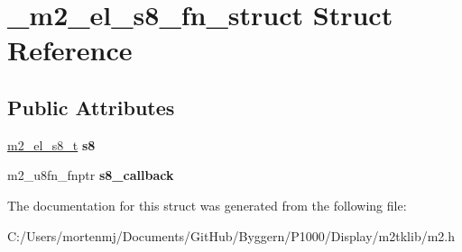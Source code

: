 \hypertarget{struct__m2__el__s8__fn__struct}{\section{\-\_\-m2\-\_\-el\-\_\-s8\-\_\-fn\-\_\-struct Struct Reference}
\label{struct__m2__el__s8__fn__struct}
}
\subsection*{Public Attributes}
\begin{DoxyCompactItemize}
\item 
\hypertarget{struct__m2__el__s8__fn__struct_a88a09a2a727107a05561ae46882abf63}{\hyperlink{struct__m2__el__s8__struct}{m2\-\_\-el\-\_\-s8\-\_\-t} {\bfseries s8}}\label{struct__m2__el__s8__fn__struct_a88a09a2a727107a05561ae46882abf63}

\item 
\hypertarget{struct__m2__el__s8__fn__struct_ae81c8bab57f1a50eb5bf4ae46ef75080}{m2\-\_\-u8fn\-\_\-fnptr {\bfseries s8\-\_\-callback}}\label{struct__m2__el__s8__fn__struct_ae81c8bab57f1a50eb5bf4ae46ef75080}

\end{DoxyCompactItemize}


The documentation for this struct was generated from the following file\-:\begin{DoxyCompactItemize}
\item 
C\-:/\-Users/mortenmj/\-Documents/\-Git\-Hub/\-Byggern/\-P1000/\-Display/m2tklib/m2.\-h\end{DoxyCompactItemize}
